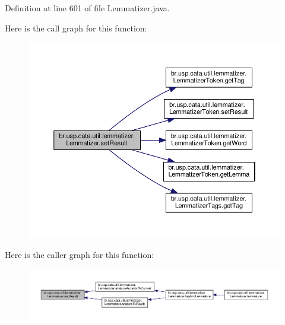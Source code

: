 Definition at line 601 of file Lemmatizer.\+java.



Here is the call graph for this function\+:\nopagebreak
\begin{figure}[H]
\begin{center}
\leavevmode
\includegraphics[width=350pt]{classbr_1_1usp_1_1cata_1_1util_1_1lemmatizer_1_1_lemmatizer_aea04b7a92d9c1840cd2e73a835ccf5ac_cgraph}
\end{center}
\end{figure}




Here is the caller graph for this function\+:\nopagebreak
\begin{figure}[H]
\begin{center}
\leavevmode
\includegraphics[width=350pt]{classbr_1_1usp_1_1cata_1_1util_1_1lemmatizer_1_1_lemmatizer_aea04b7a92d9c1840cd2e73a835ccf5ac_icgraph}
\end{center}
\end{figure}


